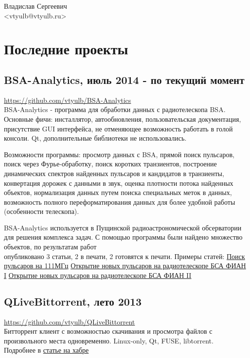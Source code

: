 \documentclass[a4paper, 8pt]{article}
\begin{document}
\begin{center}
	 Владислав Сергеевич\\
	\small<vtyulb@vtyulb.ru>
\end{center}
\section{Последние проекты} {
	\subsection{BSA-Analytics, июль 2014 - по текущий момент} {
		\href{https://github.com/vtyulb/BSA-Analytics}{https://github.com/vtyulb/BSA-Analytics} \\
		BSA-Analytics - программа для обработки данных с радиотелескопа BSA. Основные фичи: инсталлятор, автообновления, пользовательская документация,
		присутствие GUI интерфейса, не отменяющее возможность работать в голой консоли. Qt, дополнительные библиотеки не использовались.
		
		Возможности программы: просмотр данных с BSA, прямой поиск пульсаров, поиск через Фурье-обработку, поиск коротких транзиентов,
		построение динамических спектров найденных пульсаров и кандидатов в транзиенты, конвертация дорожек с данными в звук, оценка плотности
		потока найденных объектов, нормализация данных путем поиска специальных меток в данных, возможность полного переформатирования
		данных для более удобной работы (особенности телескопа). 
		
		BSA-Analytics используется в Пущинской радиоастрономической обсерватории для решения комплекса задач. 
		С помощью программы были найдено множество объектов, по результатам работ\\ опубликовано 3 статьи, 2 в печати, 2 готовятся к печати. Примеры статей:\newline
		\href{http://adsabs.harvard.edu/abs/2016ARep...60..220T}{Поиск пульсаров на 111МГц} \newline
		\href{http://comet.sai.msu.ru/~gmr/AC/AC1624.pdf}{Открытие новых пульсаров на радиотелескопе БСА ФИАН I} \newline
		\href{http://comet.sai.msu.ru/~gmr/AC/AC1625.pdf}{Открытие новых пульсаров на радиотелескопе БСА ФИАН II} \newline
	}
	
	\subsection{QLiveBittorrent, лето 2013} {
		\href{https://github.com/vtyulb/BSA-Analytics}{https://github.com/vtyulb/QLiveBittorrent}\\
		Битторрент клиент с возможностью скачивания и просмотра файлов с произвольного места одновременно. Linux-only, Qt, FUSE, libtorrent.\\
		Подробнее в \href{http://habrahabr.ru/post/185770/}{статье на хабре}
	}
	
}
\end{document}
